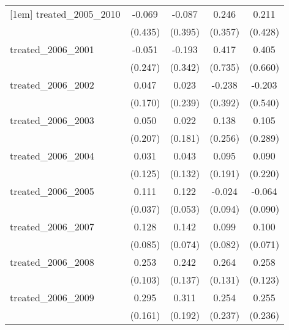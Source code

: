 {\begin{tabular}{l*{4}{c}}
[1em]
treated\_2005\_2010&      -0.069         &      -0.087         &       0.246         &       0.211         \\
            &     (0.435)         &     (0.395)         &     (0.357)         &     (0.428)         \\
[1em]
treated\_2006\_2001&      -0.051         &      -0.193         &       0.417         &       0.405         \\
            &     (0.247)         &     (0.342)         &     (0.735)         &     (0.660)         \\
[1em]
treated\_2006\_2002&       0.047         &       0.023         &      -0.238         &      -0.203         \\
            &     (0.170)         &     (0.239)         &     (0.392)         &     (0.540)         \\
[1em]
treated\_2006\_2003&       0.050         &       0.022         &       0.138         &       0.105         \\
            &     (0.207)         &     (0.181)         &     (0.256)         &     (0.289)         \\
[1em]
treated\_2006\_2004&       0.031         &       0.043         &       0.095         &       0.090         \\
            &     (0.125)         &     (0.132)         &     (0.191)         &     (0.220)         \\
[1em]
treated\_2006\_2005&       0.111\sym{**} &       0.122\sym{*}  &      -0.024         &      -0.064         \\
            &     (0.037)         &     (0.053)         &     (0.094)         &     (0.090)         \\
[1em]
treated\_2006\_2007&       0.128         &       0.142         &       0.099         &       0.100         \\
            &     (0.085)         &     (0.074)         &     (0.082)         &     (0.071)         \\
[1em]
treated\_2006\_2008&       0.253\sym{*}  &       0.242         &       0.264\sym{*}  &       0.258\sym{*}  \\
            &     (0.103)         &     (0.137)         &     (0.131)         &     (0.123)         \\
[1em]
treated\_2006\_2009&       0.295         &       0.311         &       0.254         &       0.255         \\
            &     (0.161)         &     (0.192)         &     (0.237)         &     (0.236)         \\

\end{tabular}}

